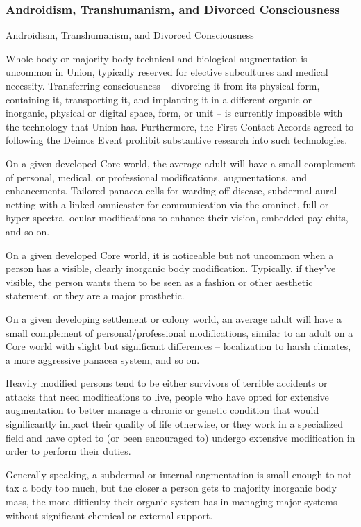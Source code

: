 \subsubsection{Androidism, Transhumanism, and Divorced Consciousness}
Androidism, Transhumanism, and Divorced Consciousness

Whole-body or majority-body technical and biological augmentation is uncommon in Union,
typically reserved for elective subcultures and medical necessity. Transferring consciousness --
divorcing it from its physical form, containing it, transporting it, and implanting it in a different
organic or inorganic, physical or digital space, form, or unit -- is currently impossible with the
technology that Union has. Furthermore, the First Contact Accords agreed to following the
Deimos Event prohibit substantive research into such technologies.


On a given developed Core world, the average adult will have a small complement of personal,
medical, or professional modifications, augmentations, and enhancements. Tailored panacea
cells for warding off disease, subdermal aural netting with a linked omnicaster for communication
via the omninet, full or hyper-spectral ocular modifications to enhance their vision, embedded
pay chits, and so on.


On a given developed Core world, it is noticeable but not uncommon when a person has a
visible, clearly inorganic body modification. Typically, if they’ve visible, the person wants them to
be seen as a fashion or other aesthetic statement, or they are a major prosthetic.



On a given developing settlement or colony world, an average adult will have a small
complement of personal/professional modifications, similar to an adult on a Core world with
slight but significant differences -- localization to harsh climates, a more aggressive panacea
system, and so on.


Heavily modified persons tend to be either survivors of terrible accidents or attacks that need
modifications to live, people who have opted for extensive augmentation to better manage a
chronic or genetic condition that would significantly impact their quality of life otherwise, or they
work in a specialized field and have opted to (or been encouraged to) undergo extensive
modification in order to perform their duties.


Generally speaking, a subdermal or internal augmentation is small enough to not tax a body too
much, but the closer a person gets to majority inorganic body mass, the more difficulty their
organic system has in managing major systems without significant chemical or external support.


